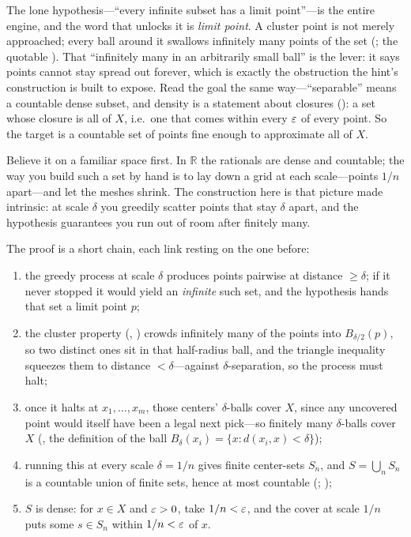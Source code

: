 \documentclass[main.tex]{subfiles}
\begin{document}
\begin{Reflection}
The lone hypothesis---``every infinite subset has a limit point''---is the entire engine, and the word
that unlocks it is \emph{limit point}. A cluster point is not merely approached; every ball around it
swallows infinitely many points of the set (; the quotable
). That
``infinitely many in an arbitrarily small ball'' is the lever: it says points cannot stay spread out
forever, which is exactly the obstruction the hint's construction is built to expose. Read the goal the
same way---``separable'' means a countable dense subset, and density is a statement about closures
(): a set whose closure is all of $X$, i.e.\ one that comes within every $\varepsilon$ of every
point. So the target is a countable set of points fine enough to approximate all of $X$.

Believe it on a familiar space first. In $\mathbb R$ the rationals are dense and countable; the way you
build such a set by hand is to lay down a grid at each scale---points $1/n$ apart---and let the meshes
shrink. The construction here is that picture made intrinsic: at scale $\delta$ you greedily scatter
points that stay $\delta$ apart, and the hypothesis guarantees you run out of room after finitely many.

The proof is a short chain, each link resting on the one before:
\begin{enumerate}[leftmargin=1.7em,itemsep=3pt,topsep=2pt,label=\textnormal{(\arabic*)}]
  \item the greedy process at scale $\delta$ produces points pairwise at distance $\ge\delta$; if it
        never stopped it would yield an \emph{infinite} such set, and the hypothesis hands that set a
        limit point $p$;
  \item the cluster property (, ) crowds infinitely many of the points into $B_{\delta/2}(p)$, so two distinct ones sit in
        that half-radius ball, and the triangle inequality squeezes them to distance $<\delta$---against
        $\delta$-separation, so the process must halt;
  \item once it halts at $x_1,\dots,x_m$, those centers' $\delta$-balls cover $X$, since any uncovered
        point would itself have been a legal next pick---so finitely many $\delta$-balls cover $X$
        (, the definition of the ball $B_\delta(x_i)=\{x:d(x_i,x)<\delta\}$);
  \item running this at every scale $\delta=1/n$ gives finite center-sets $S_n$, and
        $S=\bigcup_n S_n$ is a countable union of finite sets, hence at most countable
        (; );
  \item $S$ is dense: for $x\in X$ and $\varepsilon>0$, take $1/n<\varepsilon$, and the cover at scale $1/n$ puts some
        $s\in S_n$ within $1/n<\varepsilon$ of $x$.
\end{enumerate}


\end{Reflection}
\end{document}
